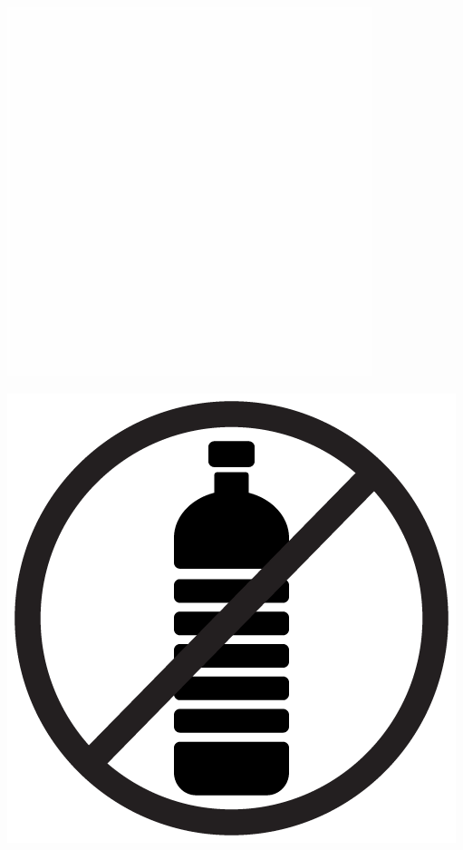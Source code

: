 \documentclass{article}
\begin{document}
\begin{multicols}{2}

\includegraphics[scale=0.2]{w}

\includegraphics[scale=0.5]{noplastic}


\end{multicols}
\end{document}
